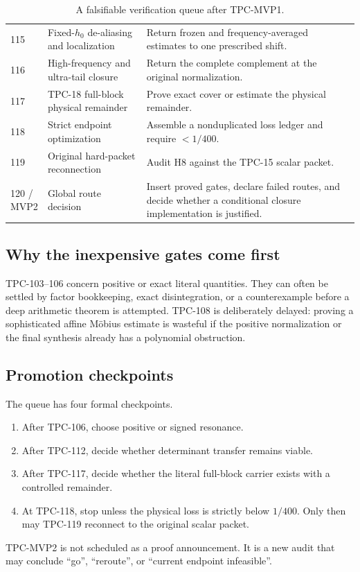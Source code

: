 \begin{table}[ht]
\begin{tabularx}{\textwidth}{@{}p{1.25cm}p{4.6cm}X@{}}
115 & Fixed-\(h_0\) de-aliasing and localization &
Return frozen and frequency-averaged estimates to one prescribed
shift.\\
116 & High-frequency and ultra-tail closure &
Return the complete complement at the original normalization.\\
117 & TPC-18 full-block physical remainder &
Prove exact cover or estimate the physical remainder.\\
118 & Strict endpoint optimization &
Assemble a nonduplicated loss ledger and require \(<1/400\).\\
119 & Original hard-packet reconnection &
Audit H8 against the TPC-15 scalar packet.\\
\shortstack{120 /\\MVP2} & Global route decision &
Insert proved gates, declare failed routes, and decide whether a
conditional closure implementation is justified.\\
\bottomrule
\end{tabularx}
\caption{A falsifiable verification queue after TPC-MVP1.}
\label{tab:queue}
\end{table}

\subsection{Why the inexpensive gates come first}

TPC-103--106 concern positive or exact literal quantities.  They can
often be settled by factor bookkeeping, exact disintegration, or a
counterexample before a deep arithmetic theorem is attempted.
TPC-108 is deliberately delayed: proving a sophisticated affine
M\"obius estimate is wasteful if the positive normalization or the
final synthesis already has a polynomial obstruction.

\subsection{Promotion checkpoints}

The queue has four formal checkpoints.
\begin{enumerate}[label=\textbf{P\arabic*.},leftmargin=2.6em]
\item After TPC-106, choose positive or signed resonance.
\item After TPC-112, decide whether determinant transfer remains
  viable.
\item After TPC-117, decide whether the literal full-block carrier
  exists with a controlled remainder.
\item At TPC-118, stop unless the physical loss is strictly below
  \(1/400\).  Only then may TPC-119 reconnect to the original scalar
  packet.
\end{enumerate}
TPC-MVP2 is not scheduled as a proof announcement.  It is a new audit
that may conclude ``go'', ``reroute'', or ``current endpoint
infeasible''.

